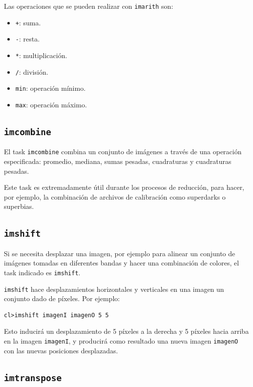 Las operaciones que se pueden realizar con \texttt{imarith} son:

\begin{itemize}
    \item \texttt{+}: suma.
    \item \texttt{-}: resta.
    \item \texttt{*}: multiplicación.
    \item \texttt{/}: división.
    \item \texttt{min}: operación mínimo.
    \item \texttt{max}: operación máximo.
\end{itemize}

\subsection{\texttt{imcombine}}

El task \texttt{imcombine} combina un conjunto de imágenes a través de una operación especificada: promedio, mediana, sumas pesadas, cuadraturas y cuadraturas pesadas.

Este task es extremadamente útil durante los procesos de reducción, para hacer, por ejemplo, la combinación de archivos de calibración como superdarks o superbias.

\subsection{\texttt{imshift}}

Si se necesita desplazar una imagen, por ejemplo para alinear un conjunto de imágenes tomadas en diferentes bandas y hacer una combinación de colores, el task indicado es \texttt{imshift}.

\texttt{imshift} hace desplazamientos horizontales y verticales en una imagen un conjunto dado de píxeles. Por ejemplo:

\begin{verbatim}
cl>imshift imagenI imagenO 5 5
\end{verbatim}

Esto inducirá un desplazamiento de 5 píxeles a la derecha y 5 píxeles hacia arriba en la imagen \texttt{imagenI}, y producirá como resultado una nueva imagen \texttt{imagenO} con las nuevas posiciones desplazadas.

\subsection{\texttt{imtranspose}}

